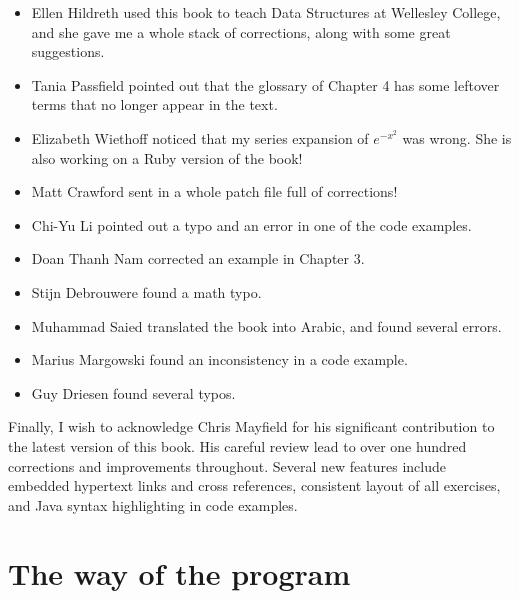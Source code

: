 \documentclass[12pt]{book}
\theoremstyle{exercise}
\begin{document}
\begin{itemize}

\item Ellen Hildreth used this book to teach Data Structures at
Wellesley College, and she gave me a whole stack of corrections,
along with some great suggestions.

\item Tania Passfield pointed out that the glossary of Chapter 4
has some leftover terms that no longer appear in the text.

\item Elizabeth Wiethoff noticed that my series expansion of
$e^{-x^2}$ was wrong.  She is also working on a Ruby version of
the book!

\item Matt Crawford sent in a whole patch file full of corrections!

\item Chi-Yu Li pointed out a typo and an error in one of the code
examples.

\item Doan Thanh Nam corrected an example in Chapter 3.

\item Stijn Debrouwere found a math typo.

\item Muhammad Saied translated the book into Arabic, and found
several errors.

\item Marius Margowski found an inconsistency in a code example.

\item Guy Driesen found several typos.

\end{itemize}

Finally, I wish to acknowledge Chris Mayfield for his significant
contribution to the latest version of this book. His careful review
lead to over one hundred corrections and improvements throughout.
Several new features include embedded hypertext links and cross
references, consistent layout of all exercises, and Java syntax
highlighting in code examples.



\setcounter{tocdepth}{1}
\tableofcontents

\mainmatter

\chapter{The way of the program}
\label{chap01}
\end{document}
